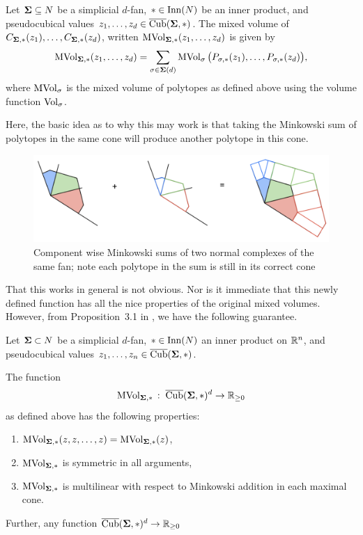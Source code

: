 \documentclass[12pt,oneside]{../../sfsuthesis}
\begin{document}
\begin{definition}\th\label{def:mixedVolNormalComplex}
    Let \( \bm{\Sigma} \subseteq N \) be a simplicial \( d \)-fan, \( \ast \in \operatorname{Inn}(N) \) be an inner product, and pseudocubical values \( z_1, \dots, z_d \in \operatorname{\overline{Cub}}(\bm{\Sigma}, \ast)\).
    The mixed volume of \( C_{\bm{\Sigma}, \ast}(z_1), \dots, C_{\bm{\Sigma}, \ast}(z_d) \), written \( \operatorname{MVol}_{\bm{\Sigma}, \ast}(z_1, \dots, z_d ) \) is given by
    \[
        \operatorname{MVol}_{\bm{\Sigma}, \ast}(z_1, \dots, z_d ) = \sum_{\sigma \in \bm{\Sigma}(d)} \operatorname{MVol}_\sigma\big(P_{\sigma, \ast}(z_1), \dots, P_{\sigma, \ast}(z_d)\big),
    \]
    where \( \operatorname{MVol}_\sigma \) is the mixed volume of polytopes as defined above using the volume function \( \operatorname{Vol}_\sigma \).
\end{definition}
Here, the basic idea as to why this may work is that taking the Minkowski sum of polytopes in the same cone will produce another polytope in this cone.
\begin{figure}[H]
    \centering
    \includegraphics[width=1.05\textwidth]{./images/mvol_ex}
    \caption{Component wise Minkowski sums of two normal complexes of the same fan; note each polytope in the sum is still in its correct cone}
\end{figure}
That this works in general is not obvious.
Nor is it immediate that this newly defined function has all the nice properties of the original mixed volumes.
However, from Proposition~3.1 in \cite{nowakMixedVolumesNormal2023}, we have the following guarantee.
\begin{proposition}
    Let \( \bm{\Sigma} \subset N \) be a simplicial \( d \)-fan, \( \ast \in \operatorname{Inn}(N) \) an inner product on \( \mathbb{R}^n \), and  pseudocubical values \( z_1, \dots, z_n \in \operatorname{\overline{Cub}}(\bm{\Sigma}, \ast)\).

    The function
    \[
        \operatorname{MVol}_{\bm{\Sigma}, \ast}\,:\; \operatorname{\overline{Cub}}(\bm{\Sigma}, \ast)^d \to \mathbb{R}_{\geq 0}
    \]
    as defined above has the following properties:
    \begin{enumerate}
        \item \( \operatorname{MVol}_{\bm{\Sigma}, \ast}(z, z, \dots, z) = \operatorname{MVol}_{\bm{\Sigma}, \ast}(z) \),
        \item \( \operatorname{MVol}_{\bm{\Sigma}, \ast} \) is symmetric in all arguments,
        \item \( \operatorname{MVol}_{\bm{\Sigma}, \ast} \) is multilinear with respect to Minkowski addition in each maximal cone.
    \end{enumerate}

    Further, any function \( \operatorname{\overline{Cub}}(\bm{\Sigma}, \ast)^d \to \mathbb{R}_{\geq 0} \)
\end{proposition}
\end{document}
